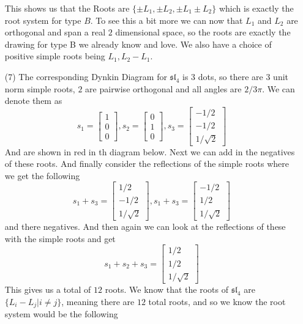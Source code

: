 \documentclass[12pt]{amsart}
\begin{document}
\begin{itemize}
    This shows us that the Roots are $\{\pm L_1, \pm L_2, \pm L_1\pm L_2\}$ which is 
    exactly the root system for type $B$. To see this a bit more we can now that $L_1$ and $L_2$ are 
    orthogonal and span a real $2$ dimensional space, so the roots are exactly the drawing for 
    type B we already know and love.
    We also have a choice of positive simple roots being $L_1, L_2-L_1$.\\
    
    
    \item[(7)] %
    The corresponding Dynkin Diagram for $\mathfrak{sl}_4$ is 3 dots, so there are 
    $3$ unit norm simple roots, $2$ are pairwise orthogonal and all angles are $2/3\pi$. 
    We can denote them as 
    \[s_1=\begin{bmatrix}1\\0\\0\end{bmatrix},
    s_2=\begin{bmatrix}0\\1\\0\end{bmatrix},
    s_3=\begin{bmatrix}-1/2\\-1/2\\1/\sqrt{2}\end{bmatrix}\]
    And are shown in red in th diagram below.
    Next we can add in the negatives of these roots. And finally consider the 
    reflections of the simple roots where we get the following
    \[s_1+s_3=\begin{bmatrix}1/2\\-1/2\\1/\sqrt{2}\end{bmatrix},
    s_1+s_3=\begin{bmatrix}-1/2\\1/2\\1/\sqrt{2}\end{bmatrix}\]
    and there negatives. And then again we can look at the reflections of these with the simple roots and get
    \[s_1+s_2+s_3=\begin{bmatrix}1/2\\1/2\\1/\sqrt{2}\end{bmatrix}\]
    This gives us a total of $12$ roots.
    We know that the roots of $\mathfrak{sl}_4$ are $\{L_i-L_j| i\neq j\}$, meaning there are $12$ total roots,
    and so we know the root system would be the following
    

\end{itemize}
\end{document}
